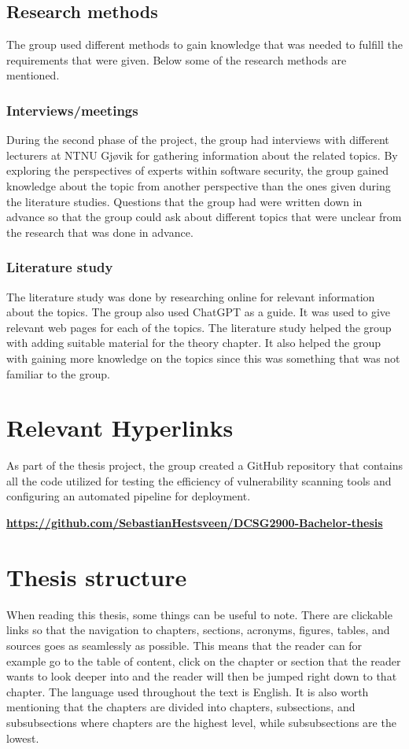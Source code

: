 \subsection{Research methods}
The group used different methods to gain knowledge that was needed to fulfill the requirements that were given. Below some of the research methods are mentioned. 

\subsubsection{Interviews/meetings}
During the second phase of the project, the group had interviews with different lecturers at NTNU Gjøvik for gathering information about the related topics. By exploring the perspectives of experts within software security, the group gained knowledge about the topic from another perspective than the ones given during the literature studies. Questions that the group had were written down in advance so that the group could ask about different topics that were unclear from the research that was done in advance.   

\subsubsection{Literature study}
The literature study was done by researching online for relevant information about the topics. The group also used ChatGPT as a guide. It was used to give relevant web pages for each of the topics. The literature study helped the group with adding suitable material for the theory chapter. It also helped the group with gaining more knowledge on the topics since this was something that was not familiar to the group. 
\newpage
\section{Relevant Hyperlinks}
As part of the thesis project, the group created a GitHub repository that contains all the code utilized for testing the efficiency of vulnerability scanning tools and configuring an automated pipeline for deployment. 

\href{https://github.com/SebastianHestsveen/DCSG2900-Bachelor-thesis}{\textbf{https://github.com/SebastianHestsveen/DCSG2900-Bachelor-thesis}}

\section{Thesis structure}
When reading this thesis, some things can be useful to note. There are clickable links so that the navigation to chapters, sections, acronyms, figures, tables, and sources goes as seamlessly as possible. This means that the reader can for example go to the table of content, click on the chapter or section that the reader wants to look deeper into and the reader will then be jumped right down to that chapter. The language used throughout the text is English. It is also worth mentioning that the chapters are divided into chapters, subsections, and subsubsections where chapters are the highest level, while subsubsections are the lowest. 
